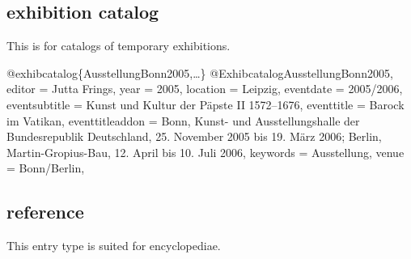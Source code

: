\documentclass[a4paper,
10pt,
ngerman,
english
]{ltxdoc}
\begin{document}
\subsection{exhibition catalog}
This is for catalogs of temporary exhibitions.
\begin{bibexample}[label=AusstellungBonn2005]{{@}exhibcatalog\{AusstellungBonn2005,…\}}
@Exhibcatalog{AusstellungBonn2005,
  editor          = {Jutta Frings},
  year            = {2005},
  location        = {Leipzig},
  eventdate       = {2005/2006},
  eventsubtitle   = {Kunst und Kultur der Päpste II 1572--1676},
  eventtitle      = {Barock im Vatikan},
  eventtitleaddon = {Bonn, Kunst- und Ausstellungshalle der Bundesrepublik Deutschland, 25. November 2005 bis 19. März 2006; Berlin, Martin-Gropius-Bau, 12. April bis 10. Juli 2006},
  keywords        = {Ausstellung},
  venue           = {Bonn/Berlin},
}
\end{bibexample}

\subsection{reference}
This entry type is suited for encyclopediae. 
\end{document}
